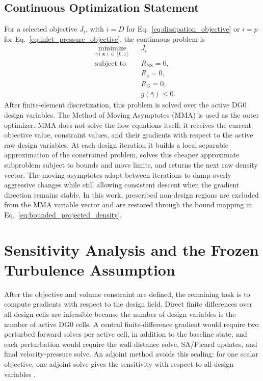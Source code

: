 \subsection{Continuous Optimization Statement}
For a selected objective $J_i$, with $i=D$ for Eq.~\ref{eq:dissipation_objective} or $i=p$ for Eq.~\ref{eq:inlet_pressure_objective}, the continuous problem is
\begin{equation}
	\begin{aligned}
		& \underset{\gamma(\mathbf{x}) \in [0,1]}{\text{minimize}}
		& & J_i \\
		& \text{subject to}
		& & R_{\mathrm{NS}}=0, \\
		& & & R_{\tilde{\nu}}=0, \\
		& & & R_G=0, \\
		& & & g(\bar{\gamma}) \leq 0 .
	\end{aligned}
	\label{eq:continuous_optimization_problem}
\end{equation}
After finite-element discretization, this problem is solved over the active DG0 design variables. The Method of Moving Asymptotes (MMA) \cite{Svanberg1987} is used as the outer optimizer. MMA does not solve the flow equations itself; it receives the current objective value, constraint values, and their gradients with respect to the active raw design variables. At each design iteration it builds a local separable approximation of the constrained problem, solves this cheaper approximate subproblem subject to bounds and move limits, and returns the next raw density vector. The moving asymptotes adapt between iterations to damp overly aggressive changes while still allowing consistent descent when the gradient direction remains stable. In this work, prescribed non-design regions are excluded from the MMA variable vector and are restored through the bound mapping in Eq.~\ref{eq:bounded_projected_density}.

\section{Sensitivity Analysis and the Frozen Turbulence Assumption}
\label{sec:frozen_turbulence}
After the objective and volume constraint are defined, the remaining task is to compute gradients with respect to the design field. Direct finite differences over all design cells are infeasible because the number of design variables is the number of active DG0 cells. A central finite-difference gradient would require two perturbed forward solves per active cell, in addition to the baseline state, and each perturbation would require the wall-distance solve, SA/Picard updates, and final velocity-pressure solve. An adjoint method avoids this scaling: for one scalar objective, one adjoint solve gives the sensitivity with respect to all design variables \cite{Othmer2014,Papoutsis2016}.


